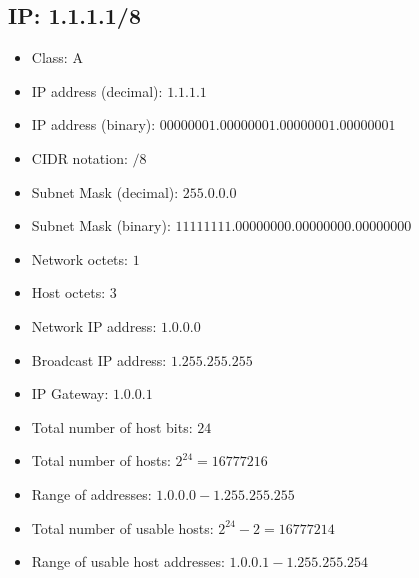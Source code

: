 \documentclass{article}
\begin{document}
\subsection*{IP: 1.1.1.1/8}
  \begin{itemize}
    \item Class: A
    \item IP address (decimal): $1.1.1.1$
    \item IP address (binary): $00000001.00000001.00000001.00000001$
    \item CIDR notation: $/8$
    \item Subnet Mask (decimal): $255.0.0.0$ 
    \item Subnet Mask (binary): $11111111.00000000.00000000.00000000$
    \item Network octets: $1$
    \item Host octets: $3$
    \item Network IP address: $1.0.0.0$
    \item Broadcast IP address: $1.255.255.255$
    \item IP Gateway: $1.0.0.1$
    \item Total number of host bits: $24$
    \item Total number of hosts: $2^{24} = 16777216$
    \item Range of addresses: $1.0.0.0 - 1.255.255.255$
    \item Total number of usable hosts: $2^{24} - 2 = 16777214$
    \item Range of usable host addresses: $1.0.0.1 - 1.255.255.254$
  \end{itemize}
\end{document}

